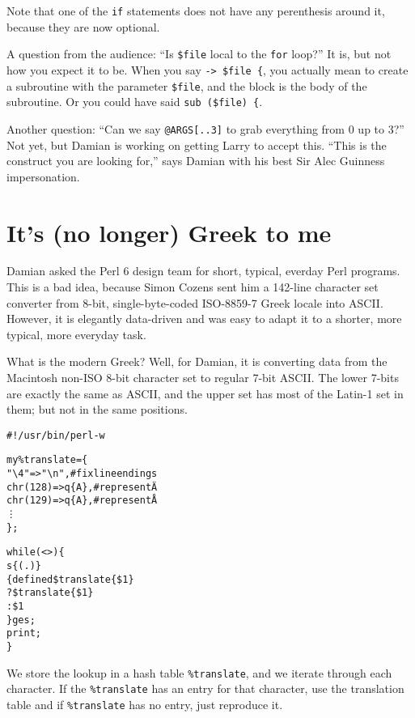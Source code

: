 \documentclass{article}
\newenvironment{example}
  {\addtolength{\linewidth}{-\parindent}%
   \null\begin{minipage}{\linewidth}}
  {\end{minipage}\addtolength{\linewidth}{\parindent}\null}
\begin{document}
Note that one of the \verb'if' statements does not have any perenthesis 
around it, because they are now optional.

A question from the audience: ``Is \verb'$file' local to the \verb'for'
loop?''  It is, but not how you expect it to be.  When you say 
\verb'-> $file {', you actually mean 
to create a subroutine with the parameter \verb'$file', and
the block is the body of the subroutine.  Or you could have said
\verb'sub ($file) {'.

Another question: ``Can we say \verb'@ARGS[..3]' to grab everything from 
0 up to 3?''  Not yet, but Damian is working on getting Larry to accept 
this.  ``This is the construct you are looking for,'' says Damian with
his best Sir Alec Guinness impersonation.

\section{It's (no longer) Greek to me}
Damian asked the Perl 6 design team for short, typical, everday Perl
programs.  This is a bad idea, because Simon Cozens sent him a 142-line
character set converter from 8-bit, single-byte-coded ISO-8859-7 Greek
locale into ASCII.  However, it is elegantly data-driven and was easy to
adapt it to a shorter, more typical, more everyday task.

What is the modern Greek?  Well, for Damian, it is converting data 
from the Macintosh non-ISO 8-bit character set to regular
7-bit ASCII.  The lower 7-bits are exactly the same as ASCII, and the
upper set has most of the Latin-1 set in them; but not in the same
positions.

\begin{example}
\begin{alltt}
\#! /usr/bin/perl -w

my \%translate = \verb'{'
  "\verb'\'4"     => "\verb'\'n",   \# fix line endings
  chr(128) => q\verb'{'A\verb'}',   \# represent \"A
  chr(129) => q\verb'{'A\verb'}',   \# represent \AA
           \vdots
\verb'}';

while (<>) \verb'{'
  s\verb'{'(.)\verb'}'
   \verb'{' defined \$translate\verb'{'\$1\verb'}'
           ? \$translate\verb'{'\$1\verb'}'
           : \$1
   \verb'}'ges;
  print;
\verb'}'

\end{alltt}
\end{example}

We store the lookup in a hash table \verb'%translate', and we iterate
through each character.  If the \verb'%translate' has an 
entry for that character, use the translation table and if 
\verb'%translate' has no entry, just reproduce it.
\end{document}

